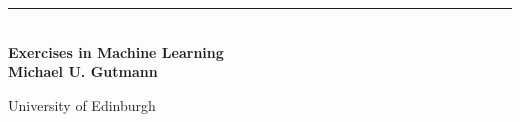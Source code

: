 %
%
%
%


\begin{titlepage} %
	
	\raggedleft %
	
	\rule{1pt}{\textheight} %
	\hspace{0.05\textwidth} %
	\parbox[b]{0.75\textwidth}{ %


    \\[\baselineskip]
    {\huge\bfseries Exercises in Machine Learning}\\[4\baselineskip] %
		{\Large \bfseries Michael U. Gutmann}\\[\baselineskip]
		
		\vspace{0.5\textheight} %

    {\noindent University of Edinburgh}\\[\baselineskip]
	}

\end{titlepage}

